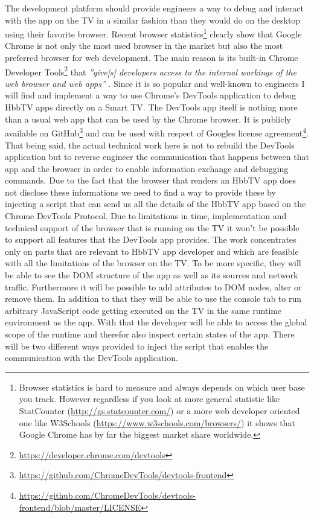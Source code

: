 The development platform should provide engineers a way to debug and interact with the app on the TV in a similar
fashion than they would do on the desktop using their favorite browser. Recent browser statistics\footnote{Browser
statistics is hard to measure and always depends on which user base you track. However regardless if you look at more
general statistic like StatCounter (\url{http://gs.statcounter.com/}) or a more web developer oriented one like
W3Schools (\url{https://www.w3schools.com/browsers/}) it shows that Google Chrome has by far the biggest market
share worldwide.} clearly show that Google Chrome is not only the most used browser in the market but also the most
preferred browser for web development. The main reason is its built-in Chrome Developer Tools\footnote{\url{https://developer.chrome.com/devtools}}
that \textit{''give[s] developers access to the internal workings of the web browser and web apps''} \cite{devtools}.
Since it is so popular and well-known to engineers I will find and implement a way to use Chrome's DevTools
application to debug HbbTV apps directly on a Smart TV. The DevTools app itself is nothing more than a usual web app
that can be used by the Chrome browser. It is publicly available on GitHub\footnote{\url{https://github.com/ChromeDevTools/devtools-frontend}}
and can be used with respect of Googles license agreement\footnote{\url{https://github.com/ChromeDevTools/devtools-frontend/blob/master/LICENSE}}.
That being said, the actual technical work here is not to rebuild the DevTools application but to reverse
engineer the communication that happens between that app and the browser in order to enable information exchange
and debugging commands. Due to the fact that the browser that renders an HbbTV app does not disclose these
informations we need to find a way to provide these by injecting a script that can send us all the details
of the HbbTV app based on the Chrome DevTools Protocol. Due to limitations in time, implementation and technical
support of the browser that is running on the TV it won't be possible to support all features that the DevTools
app provides. The work concentrates only on parts that are relevant to HbbTV app developer and which are feasible
with all the limitations of the browser on the TV. To be more specific, they will be able to see the DOM structure
of the app as well as its sources and network traffic. Furthermore it will be possible to add attributes to DOM
nodes, alter or remove them. In addition to that they will be able to use the console tab to run arbitrary JavaScript
code getting executed on the TV in the same runtime environment as the app. With that the developer will be able
to access the global scope of the runtime and therefor also inspect certain states of the app. There will be two
different ways provided to inject the script that enables the communication with the DevTools application.

